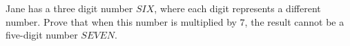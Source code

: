 Jane has a three digit number $SIX$, where each digit represents a different number. Prove that when this number is multiplied by $7$, the result cannot be a five-digit number $SEVEN$.




